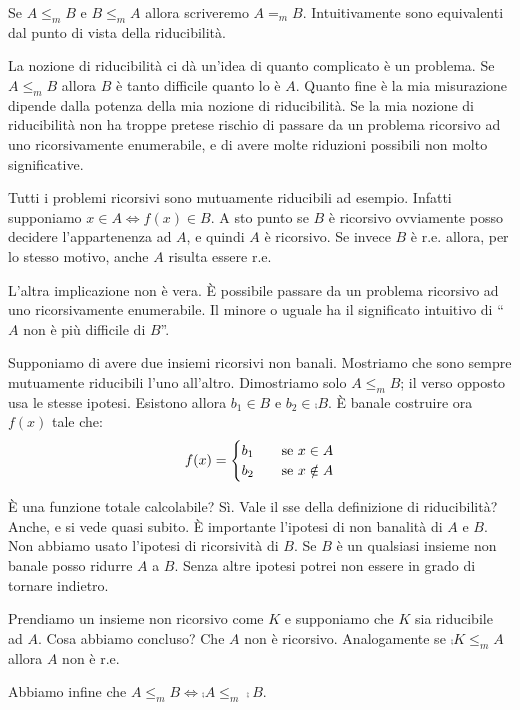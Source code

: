 Se $A \leq_{m} B$ e $B \leq_{m} A$ allora scriveremo $A =_{m} B$. Intuitivamente sono equivalenti
dal punto di vista della riducibilità.

La nozione di riducibilità ci dà un'idea di quanto complicato è un problema. Se $A \leq_{m} B$
allora $B$ è tanto difficile quanto lo è $A$. Quanto fine è la mia misurazione dipende dalla potenza
della mia nozione di riducibilità. Se la mia nozione di riducibilità non ha troppe pretese rischio
di passare da un problema ricorsivo ad uno ricorsivamente enumerabile, e di avere molte riduzioni
possibili non molto significative.

Tutti i problemi ricorsivi sono mutuamente riducibili ad esempio. Infatti supponiamo $x \in A \iff
f(x) \in B$. A sto punto se $B$ è ricorsivo ovviamente posso decidere l'appartenenza ad $A$, e
quindi $A$ è ricorsivo. Se invece $B$ è r.e. allora, per lo stesso motivo, anche $A$ risulta essere
r.e.

L'altra implicazione non è vera. È possibile passare da un problema ricorsivo ad uno
ricorsivamente enumerabile. Il minore o uguale ha il significato intuitivo di ``$A$ non è più
difficile di $B$''.

Supponiamo di avere due insiemi ricorsivi non banali. Mostriamo che sono sempre mutuamente
riducibili l'uno all'altro. Dimostriamo solo $A \leq_{m} B$; il verso opposto usa le stesse ipotesi.
Esistono allora $b_{1} \in B$ e $b_{2} \in \comp{B}$. È banale costruire ora $f(x)$ tale che:
\begin{equation*}
    f(x) =
    \begin{cases}
        b_{1} \quad &\text{se $x \in A$} \\
        b_{2} \quad &\text{se $x \notin A$}
    \end{cases}
\end{equation*}

È una funzione totale calcolabile? Sì. Vale il sse della definizione di riducibilità? Anche, e si
vede quasi subito. È importante l'ipotesi di non banalità di $A$ e $B$. Non abbiamo usato l'ipotesi di
ricorsività di $B$. Se $B$ è un qualsiasi insieme non banale posso ridurre $A$ a $B$. Senza altre ipotesi
potrei non essere in grado di tornare indietro.

Prendiamo un insieme non ricorsivo come $K$ e supponiamo che $K$ sia riducibile ad $A$. Cosa abbiamo
concluso? Che $A$ non è ricorsivo. Analogamente se $\comp{K} \leq_{m} A$ allora $A$ non è r.e.

Abbiamo infine che $A \leq_{m} B \iff \comp{A} \leq_{m} \comp{B}$.

